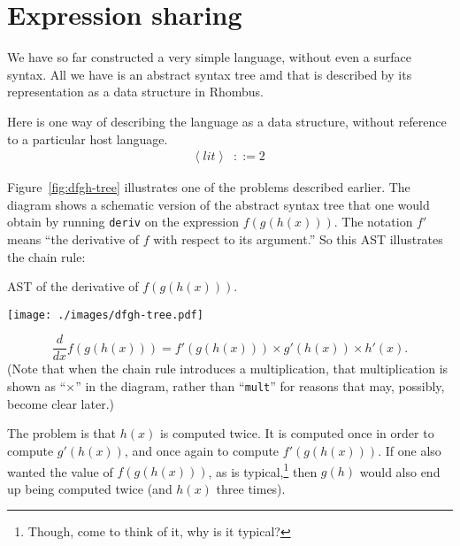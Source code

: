 \documentclass[11pt, a4paper]{article}
\newcommand{\cd}[1]{\texttt{#1}}
\begin{document}
\section{Expression sharing}

We have so far constructed a very simple language, without even a
surface syntax. All we have is an abstract syntax tree amd that is
described by its representation as a data structure in Rhombus.

Here is one way of describing the language as a data structure,
without reference to a particular host language. 
\newcommand{\nt}[1]{\langle\operatorname{\textit{#1}}\rangle}
\begin{equation}
  \label{eq:lang0}
  \begin{aligned}
    \nt{lit} & ::= 2 
  \end{aligned}
\end{equation}


Figure~\ref{fig:dfgh-tree} illustrates one of the problems described
earlier. The diagram shows a schematic version of the abstract syntax
tree that one would obtain by running \cd{deriv} on the expression
$f(g(h(x)))$. The notation $f'$ means ``the derivative of $f$ with
respect to its argument.'' So this AST illustrates the chain rule:
\begin{marginfigure}
  \caption{AST of the derivative of $f(g(h(x)))$.\label{fig:dfgh-tree}}
  \texttt{[image: ./images/dfgh-tree.pdf]}
\end{marginfigure}
\begin{equation*}
  \frac{d}{dx} f(g(h(x))) = f'(g(h(x))) \times g'(h(x)) \times h'(x).
\end{equation*}
(Note that when the chain rule introduces a multiplication, that
multiplication is shown as ``$\times$'' in the diagram, rather than
``\cd{mult}'' for reasons that may, possibly, become clear later.)

The problem is that $h(x)$ is computed twice. It is computed once in
order to compute $g'(h(x))$, and once again to compute
$f'(g(h(x)))$. If one also wanted the value of $f(g(h(x)))$, as is
typical,\footnote{Though, come to think of it, why is it typical?}
then $g(h)$ would also end up being computed twice (and $h(x)$ three
times).
\end{document}
